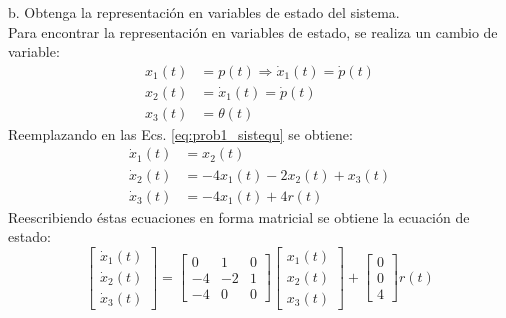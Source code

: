 \documentclass[11pt, spanish]{article}
\begin{document}
\begin{description}
\begin{description}
				\item b. Obtenga la representación en variables de estado del sistema.\\
				Para encontrar la representación en variables de estado, se realiza un cambio de variable:
				\begin{align*}
					x_1(t) &= p(t) \Rightarrow \dot{x}_1(t) = \dot{p}(t)\\
					x_2(t) &= \dot{x}_1(t) = \dot{p}(t)\\
					x_3(t) &= \theta(t)
				\end{align*}
				Reemplazando en las Ecs. \ref{eq:prob1_sistequ} se obtiene:
				\begin{align*}
					\dot{x}_1(t) &= x_2(t)\\
					\dot{x}_2(t) &= -4x_1(t) -2x_2(t) + x_3(t)\\
					\dot{x}_3(t) &= -4x_1(t) + 4r(t)
				\end{align*}
				Reescribiendo éstas ecuaciones en forma matricial se obtiene la ecuación de estado:
				\begin{equation*}
					\begin{bmatrix}
						\dot{x}_1(t)\\ \dot{x}_2(t)\\ \dot{x}_3(t) 
					\end{bmatrix} = 
					\begin{bmatrix}
						 0 &  1 & 0\\
						-4 & -2 & 1\\
						-4 &  0 & 0
					\end{bmatrix}
					\begin{bmatrix}
						x_1(t)\\ x_2(t)\\ x_3(t) 
					\end{bmatrix} +
					\begin{bmatrix}
						0 \\ 0 \\ 4
					\end{bmatrix} r(t)
				\end{equation*}
			\end{description}
			

\end{description}
\end{document}
